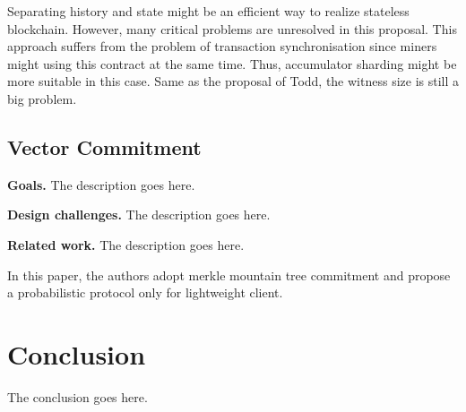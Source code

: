 \documentclass[conference]{IEEEtran}
\begin{document}
Separating history and state might be an efficient way to realize stateless blockchain.
%
However, many critical problems are unresolved in this proposal.
%
This approach suffers from the problem of transaction synchronisation since miners might using this contract at the same time.
%
Thus, accumulator sharding might be more suitable in this case.
%
Same as the proposal of Todd, the witness size is still a big problem.




\subsection{Vector Commitment}

\textbf{Goals.} The description goes here.


\textbf{Design challenges.} The description goes here.

\textbf{Related work.} The description goes here.


%
In this paper\cite{luuflyclient}, the authors adopt merkle mountain tree commitment and propose a probabilistic protocol only for lightweight client.
%


\section{Conclusion}

The conclusion goes here.




\end{document}
